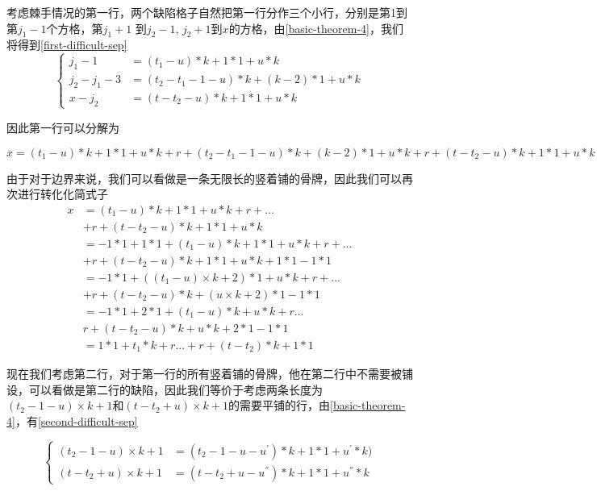 考虑棘手情况的第一行，两个缺陷格子自然把第一行分作三个小行，分别是第1到第$j_1 - 1$个方格，第$j_1 + 1$ 到$j_2 - 1$, $j_2 + 1$到$x$的方格，由\ref*{basic-theorem-4}，我们将得到\ref*{first-difficult-sep}
$$
    \left\{
    \begin{aligned}
        j_1 - 1       & = (t_1 - u) * k  + 1 * 1 + u * k                 \\
        j_2 - j_1 - 3 & = (t_2 - t_1 - 1 - u) * k  + (k - 2) * 1 + u * k \\
        x - j_2       & = (t - t_2 - u) * k  + 1 * 1 + u * k
        \label{first-difficult-sep}
    \end{aligned}
    \right.
$$

因此第一行可以分解为

$x = (t_1 - u) * k  + 1 * 1 + u * k + r +  (t_2 - t_1 - 1 - u) * k  + (k - 2) * 1 + u * k + r + (t - t_2 - u) * k  + 1 * 1 + u * k$

由于对于边界来说，我们可以看做是一条无限长的竖着铺的骨牌，因此我们可以再次进行转化化简式子
$$
    \begin{aligned}
        x & = (t_1 - u) * k  + 1 * 1 + u * k + r + ...                  \\
          & + r + (t - t_2 - u) * k  + 1 * 1 + u * k                    \\
          & = -1 * 1 + 1 * 1 + (t_1 - u) * k  + 1 * 1 + u * k + r + ... \\
          & + r + (t - t_2 - u) * k  + 1 * 1 + u * k + 1 * 1 - 1 * 1    \\
          & = -1 * 1 + ((t_1 - u) \times k  + 2)  * 1 + u * k + r + ... \\
          & + r + (t - t_2 - u) * k  +  (u \times k + 2) * 1 - 1 * 1    \\
          & = -1 * 1 + 2 * 1 + (t_1 - u) * k  + u * k + r ...           \\
          & r + (t - t_2 - u) * k  +  u * k + 2 * 1 - 1 * 1             \\
          & = 1 * 1 +  t_1 * k + r ... + r + (t - t_2) * k + 1 * 1
    \end{aligned}
$$

现在我们考虑第二行，对于第一行的所有竖着铺的骨牌，他在第二行中不需要被铺设，可以看做是第二行的缺陷，因此我们等价于考虑两条长度为$(t_2 - 1 - u) \times k + 1$和$(t - t_2 + u) \times k + 1$的需要平铺的行，由\ref*{basic-theorem-4}，有\ref*{second-difficult-sep}

$$
    \left\{
    \begin{aligned}
        (t_2- 1 - u) \times k + 1  & = (t_2- 1 - u - u^{'}) * k + 1* 1 +  u^{'} * k)    \\
        (t - t_2 + u) \times k + 1 & = (t - t_2 + u - u^{''}) * k + 1 * 1 +  u^{''} * k
        \label{second-difficult-sep}
    \end{aligned}
    \right.
$$

